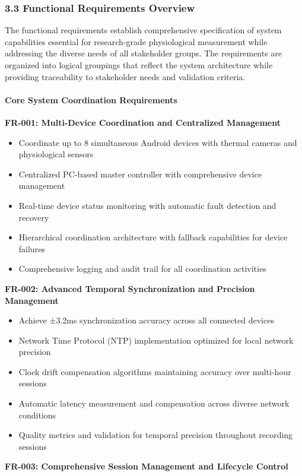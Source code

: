 \documentclass[12pt,a4paper]{report}
\begin{document}
\subsubsection{3.3 Functional Requirements Overview}

The functional requirements establish comprehensive specification of system capabilities essential for research-grade
physiological measurement while addressing the diverse needs of all stakeholder groups. The requirements are organized
into logical groupings that reflect the system architecture while providing traceability to stakeholder needs and
validation criteria.

\paragraph{Core System Coordination Requirements}

\textbf{FR-001: Multi-Device Coordination and Centralized Management}

\begin{itemize}
\item Coordinate up to 8 simultaneous Android devices with thermal cameras and physiological sensors
\item Centralized PC-based master controller with comprehensive device management
\item Real-time device status monitoring with automatic fault detection and recovery
\item Hierarchical coordination architecture with fallback capabilities for device failures
\item Comprehensive logging and audit trail for all coordination activities

\end{itemize}
\textbf{FR-002: Advanced Temporal Synchronization and Precision Management}

\begin{itemize}
\item Achieve ±3.2ms synchronization accuracy across all connected devices
\item Network Time Protocol (NTP) implementation optimized for local network precision
\item Clock drift compensation algorithms maintaining accuracy over multi-hour sessions
\item Automatic latency measurement and compensation across diverse network conditions
\item Quality metrics and validation for temporal precision throughout recording sessions

\end{itemize}
\textbf{FR-003: Comprehensive Session Management and Lifecycle Control}
\end{document}
